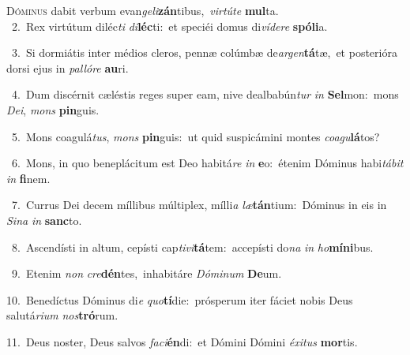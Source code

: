 \lettrine{\initial\textcolor{\initialcolor}{D}}{óminus} dabit verbum evan\-\textit{ge}\-\textit{li}\textbf{zán}tibus,~\star \textit{vir}\-\textit{tú}\textit{te} \textbf{mul}\-ta.\\
{\numbfont\textcolor{\numbcolor}{~2.}}~Rex virtútum diléc\textit{ti} \textit{di}\-\textbf{léc}ti:~\star et speciéi domus di\-\textit{ví}\-\textit{de}\textit{re} \textbf{spó}\-\textbf{li}a.\par
{\numbfont\textcolor{\numbcolor}{~3.}}~Si dormiátis inter médios cleros, pennæ colúmbæ de\-\textit{ar}\-\textit{gen}\textbf{tá}tæ,~\star et posterióra dorsi ejus in \textit{pal}\-\textit{ló}\textit{re} \textbf{au}\-ri.\par
{\numbfont\textcolor{\numbcolor}{~4.}}~Dum discérnit cæléstis reges super eam, nive dealbabún\textit{tur} \textit{in} \textbf{Sel}\-mon:~\star mons \textit{De}\-\textit{i}, \textit{mons} \textbf{pin}\-guis.\par
{\numbfont\textcolor{\numbcolor}{~5.}}~Mons coagulá\-\textit{tus}\-, \textit{mons} \textbf{pin}\-guis:~\star ut quid suspicámini montes \textit{co}\-\textit{a}\textit{gu}\textbf{lá}tos?\par
{\numbfont\textcolor{\numbcolor}{~6.}}~Mons, in quo beneplácitum est Deo habitá\textit{re} \textit{in} \textbf{e}\-o:~\star étenim Dóminus habi\-\textit{tá}\-\textit{bit} \textit{in} \textbf{fi}\-nem.\par
{\numbfont\textcolor{\numbcolor}{~7.}}~Currus Dei decem míllibus múltiplex, mílli\textit{a} \textit{læ}\-\textbf{tán}tium:~\star Dóminus in eis in \textit{Si}\-\textit{na} \textit{in} \textbf{sanc}\-to.\par
{\numbfont\textcolor{\numbcolor}{~8.}}~Ascendísti in altum, cepísti cap\-\textit{ti}\-\textit{vi}\textbf{tá}tem:~\star accepísti do\textit{na} \textit{in} \textit{ho}\-\textbf{mí}\textbf{ni}bus.\par
{\numbfont\textcolor{\numbcolor}{~9.}}~Etenim \textit{non} \textit{cre}\-\textbf{dén}tes,~\star inhabitáre \textit{Dó}\-\textit{mi}\textit{num} \textbf{De}\-um.\par
{\numbfont\textcolor{\numbcolor}{10.}}~Benedíctus Dóminus di\textit{e} \textit{quo}\-\textbf{tí}die:~\star prósperum iter fáciet nobis Deus salutá\-\textit{ri}\-\textit{um} \textit{nos}\-\textbf{tró}rum.\par
{\numbfont\textcolor{\numbcolor}{11.}}~Deus noster, Deus salvos \textit{fa}\-\textit{ci}\textbf{én}di:~\star et Dómini Dómini \textit{éx}\-\textit{i}\textit{tus} \textbf{mor}\-tis.\par
